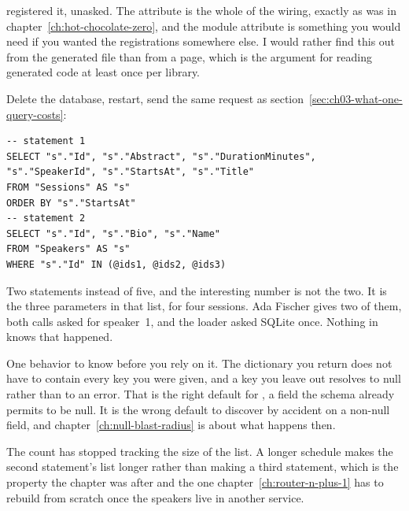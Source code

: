  registered it, unasked. The attribute is the whole of
the wiring, exactly as \code{[QueryType]} was in
chapter~\ref{ch:hot-chocolate-zero}, and the module attribute is something you
would need if you wanted the registrations somewhere else. I would rather find
this out from the generated file than from a page, which is the argument for
reading generated code at least once per library.

%
Delete the database, restart, send the same request as
section~\ref{sec:ch03-what-one-query-costs}:

\begin{verbatim}
-- statement 1
SELECT "s"."Id", "s"."Abstract", "s"."DurationMinutes", "s"."SpeakerId", "s"."StartsAt", "s"."Title"
FROM "Sessions" AS "s"
ORDER BY "s"."StartsAt"
-- statement 2
SELECT "s"."Id", "s"."Bio", "s"."Name"
FROM "Speakers" AS "s"
WHERE "s"."Id" IN (@ids1, @ids2, @ids3)
\end{verbatim}

%
Two statements instead of five, and the interesting number is not the two. It
is the three parameters in that  list, for four sessions. Ada Fischer
gives two of them, both calls asked for speaker~1, and the loader asked SQLite
once. Nothing in  knows that happened.

%
One behavior to know before you rely on it. The dictionary you return does not
have to contain every key you were given, and a key you leave out resolves to
null rather than to an error. That is the right default for
, a field the schema already permits to be null. It is
the wrong default to discover by accident on a non-null field, and
chapter~\ref{ch:null-blast-radius} is about what happens then.

The count has stopped tracking the size of the list. A longer schedule makes
the second statement's  list longer rather than making a third
statement, which is the property the chapter was after and the one
chapter~\ref{ch:router-n-plus-1} has to rebuild from scratch once the speakers
live in another service.
%

